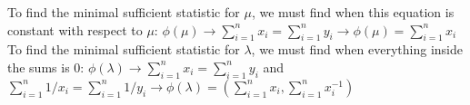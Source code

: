 \documentclass{article}
\begin{document}
To find the minimal sufficient statistic for $\mu$, we must find when this equation is constant with respect to $\mu$: \newline
\newline
$\phi(\mu) \rightarrow \sum_{i=1}^{n} x_i = \sum_{i=1}^{n} y_i \rightarrow \phi(\mu) = \sum_{i=1}^{n} x_i$ \newline
\newline
To find the minimal sufficient statistic for $\lambda$, we must find when everything inside the sums is 0: \newline
\newline
$\phi(\lambda) \rightarrow \sum_{i=1}^{n} x_i = \sum_{i=1}^{n} y_i$ and $\sum_{i=1}^{n} 1/x_i = \sum_{i=1}^{n} 1/y_i \rightarrow \phi(\lambda) = (\sum_{i=1}^{n} x_i, \sum_{i=1}^{n} x_i^{-1})$
\end{document}

